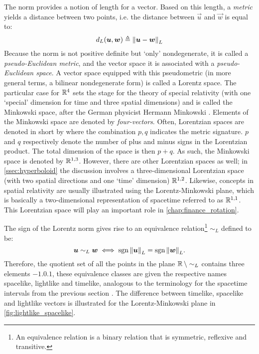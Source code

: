 The norm provides a notion of length for a vector. Based on this length, a \emph{metric} yields a distance between two points, i.e. the distance between \(\vec{u}\) and \(\vec{w}\) is equal to:
\[
     d_L(\vb*{u}, \vb*{w}) \triangleq \norm{\vb*{u} - \vb*{w}}_L
\] 
Because the norm is not positive definite but `only' nondegenerate, it is called a \emph{pseudo-Euclidean metric}, and the vector space it is associated with a \emph{pseudo-Euclidean space}. A vector space equipped with this pseudometric (in more general terms, a bilinear nondegenerate form) is called a Lorentz space. The particular case for \(\mathbb{R}^4\) sets the stage for the theory of special relativity (with one `special' dimension for time and three spatial dimensions) and is called the Minkowski space, after the German physicist Hermann Minkowski \cite{Catoni2008}. Elements of the Minkowski space are denoted by \emph{four-vectors}. Often, Lorentzian spaces are denoted in short by  where the combination $p,q$ indicates the metric signature. $p$ and $q$ respectively denote the number of plus and minus signs in the Lorentzian product. The total dimension of the space is then $p + q$. As such, the Minkowski space is denoted by $\mathbb{R}^{1,3}$. However, there are other Lorentzian spaces as well; in \cref{ssec:hyperboloid} the discussion involves a three-dimensional Lorentzian space (with two spatial directions and one `time' dimension) $\mathbb{R}^{1,2}$. Likewise, concepts in spatial relativity are usually illustrated using the Lorentz-Minkowski plane, which is basically a two-dimensional representation of spacetime referred to as $\mathbb{R}^{1,1}$. This Lorentzian space will play an important role in \cref{chap:finance_rotation}.

The sign of the Lorentz norm gives rise to an equivalence relation\footnote{An equivalence relation  is a binary relation that is symmetric, reflexive and transitive.}  \(\sim_L\) defined to be:
$$\vb*{u} \sim_L \vb*{w} \iff \operatorname{sgn}{\norm{\vb*{u}}}_L = \operatorname{sgn}{\norm{\vb*{w}}}_L.$$
Therefore, the quotient set of all the points in the plane \(\mathbb{R}\,\backslash\sim_L\) contains three elements \(\qty{-1, 0, 1}\), these equivalence classes are given the respective names spacelike, lightlike and timelike, analogous to the terminology for the spacetime intervals from the previous section \cite{Landau1971}. The difference between timelike, spacelike and lightlike vectors is illustrated for the Lorentz-Minkowski plane in \cref{fig:lightlike_spacelike}.

